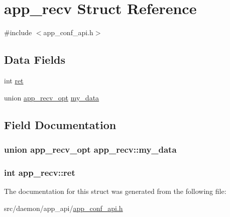\hypertarget{structapp__recv}{}\section{app\+\_\+recv Struct Reference}
\label{structapp__recv}


{\ttfamily \#include $<$app\+\_\+conf\+\_\+api.\+h$>$}

\subsection*{Data Fields}
\begin{DoxyCompactItemize}
\item 
int \hyperlink{structapp__recv_a71e8b9f7ef6fc6638e4f27f89f1128c5}{ret}
\item 
union \hyperlink{unionapp__recv__opt}{app\+\_\+recv\+\_\+opt} \hyperlink{structapp__recv_a7b1f4967abdc1abfc7c766dbb390d406}{my\+\_\+data}
\end{DoxyCompactItemize}


\subsection{Field Documentation}
\subsubsection[{\texorpdfstring{my\+\_\+data}{my_data}}]{\setlength{\rightskip}{0pt plus 5cm}union {\bf app\+\_\+recv\+\_\+opt} app\+\_\+recv\+::my\+\_\+data}\hypertarget{structapp__recv_a7b1f4967abdc1abfc7c766dbb390d406}{}\label{structapp__recv_a7b1f4967abdc1abfc7c766dbb390d406}
\subsubsection[{\texorpdfstring{ret}{ret}}]{\setlength{\rightskip}{0pt plus 5cm}int app\+\_\+recv\+::ret}\hypertarget{structapp__recv_a71e8b9f7ef6fc6638e4f27f89f1128c5}{}\label{structapp__recv_a71e8b9f7ef6fc6638e4f27f89f1128c5}


The documentation for this struct was generated from the following file\+:\begin{DoxyCompactItemize}
\item 
src/daemon/app\+\_\+api/\hyperlink{app__conf__api_8h}{app\+\_\+conf\+\_\+api.\+h}\end{DoxyCompactItemize}
